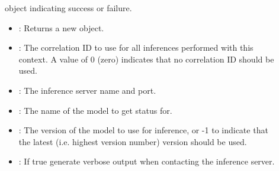 \documentclass[letterpaper,10pt,english]{sphinxmanual}
\begin{document}
\begin{fulllineitems}
\begin{fulllineitems}
\begin{description}
\item[{}] \leavevmode
{\hyperref[\detokenize{cpp_api/classnvidia_1_1inferenceserver_1_1client_1_1Error:classnvidia_1_1inferenceserver_1_1client_1_1Error}]{}} object indicating success or failure. 

\item[{}] \leavevmode\begin{itemize}
\item {} 
: Returns a new {\hyperref[\detokenize{cpp_api/classnvidia_1_1inferenceserver_1_1client_1_1InferHttpContext:classnvidia_1_1inferenceserver_1_1client_1_1InferHttpContext}]{}} object. 

\item {} 
: The correlation ID to use for all inferences performed with this context. A value of 0 (zero) indicates that no correlation ID should be used. 

\item {} 
: The inference server name and port. 

\item {} 
: The name of the model to get status for. 

\item {} 
: The version of the model to use for inference, or -1 to indicate that the latest (i.e. highest version number) version should be used. 

\item {} 
: If true generate verbose output when contacting the inference server. 

\end{itemize}

\end{description}


\end{fulllineitems}


\end{fulllineitems}
\end{document}
